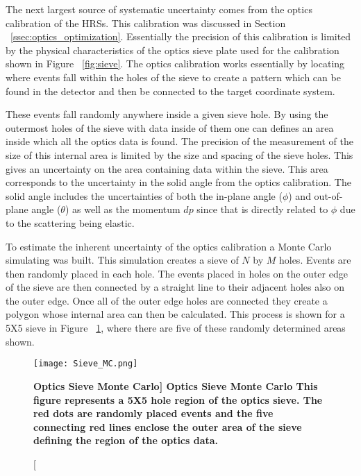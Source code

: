 The next largest source of systematic uncertainty comes from the optics calibration of the HRSs. This calibration was discussed in Section ~\ref{ssec:optics_optimization}. Essentially the precision of this calibration is limited by the physical characteristics of the optics sieve plate used for the calibration shown in Figure ~\ref{fig:sieve}. The optics calibration works essentially by locating where events fall within the holes of the sieve to create a pattern which can be found in the detector and then be connected to the target coordinate system. 

These events fall randomly anywhere inside a given sieve hole. By using the outermost holes of the sieve with data inside of them one can defines an area inside which all the optics data is found. The precision of the measurement of the size of this internal area is limited by the size and spacing of the sieve holes. This gives an uncertainty on the area containing data within the sieve. This area corresponds to the uncertainty in the solid angle from the optics calibration. The solid angle includes the uncertainties of both the in-plane angle ($\phi$) and out-of-plane angle ($\theta$) as well as the momentum $dp$ since that is directly related to $\phi$ due to the scattering being elastic.  

To estimate the inherent uncertainty of the optics calibration a Monte Carlo simulating was built. This simulation creates a sieve of $N$ by $M$ holes. Events are then randomly placed in each hole. The events placed in holes on the outer edge of the sieve are then connected by a straight line to their adjacent holes also on the outer edge. Once all of the outer edge holes are connected they create a polygon whose internal area can then be calculated. This process is shown for a 5X5 sieve in Figure ~\ref{fig:sieve_mc}, where there are five of these randomly determined areas shown. 

\begin{figure}[!ht]
\begin{center}
\texttt{[image: Sieve\_MC.png]}
\end{center}
\caption[\bf{Optics Sieve Monte Carlo}]{
{\bf{Optics Sieve Monte Carlo}} This figure represents a 5X5 hole region of the optics sieve. The red dots are randomly placed events and the five connecting red lines enclose the outer area of the sieve defining the region of the optics data.}
\label{fig:sieve_mc}
\end{figure}

